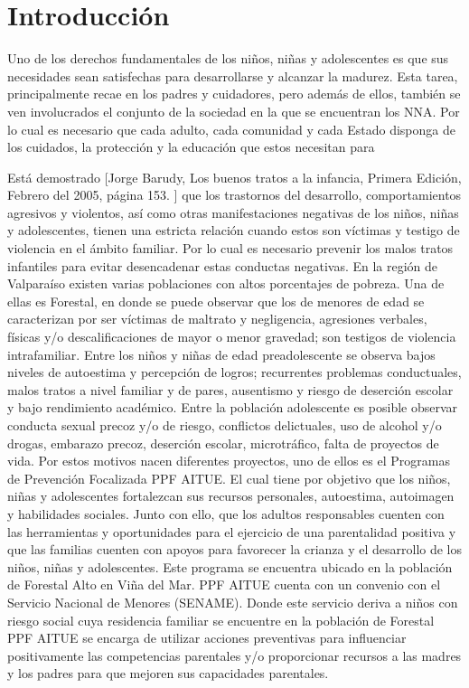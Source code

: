 \documentclass[12pt,letterpaper]{article}
\begin{document}
\newpage

\tableofcontents
\newpage

\listoftables
\listoffigures
\newpage



\section{Introducci\'on}
\label{intr}


Uno de los derechos fundamentales de los niños, niñas y adolescentes es que sus necesidades sean satisfechas para desarrollarse y alcanzar la madurez. 
Esta tarea, principalmente recae en los padres y cuidadores, pero además de ellos, también se ven involucrados el conjunto de la sociedad en la que se encuentran los NNA. Por lo cual es necesario que cada adulto, cada comunidad y cada Estado disponga de los cuidados, la protección y la educación que estos necesitan para 

Está demostrado [Jorge Barudy, Los buenos tratos a la infancia, Primera Edición, Febrero del 2005, página 153. ] que los trastornos del desarrollo, comportamientos agresivos y violentos, así como otras manifestaciones negativas de los niños, niñas y adolescentes, tienen una estricta relación cuando estos son víctimas y testigo de violencia en el ámbito familiar.
Por lo cual es necesario prevenir los malos tratos infantiles para evitar desencadenar estas conductas negativas. 
En la región de Valparaíso existen varias poblaciones con altos porcentajes de pobreza. Una de ellas es Forestal, en donde se puede observar que los de menores de edad se caracterizan por ser víctimas de maltrato y negligencia, agresiones verbales, físicas y/o descalificaciones de mayor o menor gravedad; son testigos de violencia intrafamiliar. Entre los niños y niñas de edad preadolescente se observa bajos niveles de autoestima y percepción de logros; recurrentes problemas conductuales, malos tratos a nivel familiar y de pares, ausentismo y riesgo de deserción escolar y bajo rendimiento académico. Entre la población adolescente es posible observar conducta sexual precoz y/o de riesgo, conflictos delictuales, uso de alcohol y/o drogas, embarazo precoz, deserción escolar, microtráfico,  falta de proyectos de vida. 
Por estos motivos nacen diferentes proyectos, uno de ellos es el Programas de Prevención Focalizada PPF AITUE. El cual tiene por objetivo que los niños, niñas y adolescentes fortalezcan sus recursos personales, autoestima, autoimagen y habilidades sociales. Junto con ello, que los adultos responsables cuenten con las herramientas y oportunidades para el ejercicio de una parentalidad positiva y que las familias cuenten con apoyos para favorecer la crianza y el desarrollo de los niños, niñas y adolescentes. 
Este programa se encuentra ubicado en la población de Forestal Alto en Viña del Mar. PPF AITUE cuenta con un convenio con el Servicio Nacional de Menores (SENAME). Donde este servicio deriva a niños con riesgo social cuya residencia familiar se encuentre en la población de Forestal
PPF AITUE se encarga de utilizar acciones preventivas para influenciar positivamente las competencias parentales   y/o proporcionar recursos a las madres y los padres para que mejoren sus capacidades parentales.
 
\end{document}
